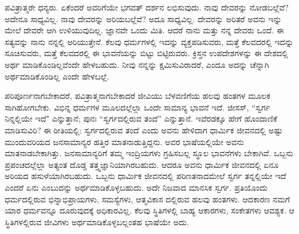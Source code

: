 ಪವಿತ್ರಾತ್ಮರೇ ಧನ್ಯರು. ಏಕೆಂದರೆ ಅವರಿಗೆಯೇ ಭಗವತ್ ದರ್ಶನ ಲಭಿಸುವುದು. ನಾವು ದೇವರನ್ನು ನೋಡಬಲ್ಲೆವೆ? ಅದೇನೂ ಸಾಧ್ಯವಿಲ್ಲ. ನಾವು ದೇವರನ್ನು ಅರಿಯಬಲ್ಲೆವೆ? ಅದೂ ಸಾಧ್ಯವಿಲ್ಲ. ದೇವರನ್ನು ಅರಿತರೆ ಅವನು ಇನ್ನು ಮೇಲೆ ದೇವರೇ ಆಗಿ ಉಳಿಯುವುದಿಲ್ಲ. ಜ್ಞಾನವೇ ಒಂದು ಮಿತಿ. ಆದರೆ ನಾನು ಮತ್ತು ನನ್ನ ದೇವರು ಒಂದೆ. ಈ ಸತ್ಯವನ್ನು ನಾನು ನನ್ನಲ್ಲಿ ಅರಿಯುತ್ತೇನೆ. ಕೆಲವು ಧರ್ಮಗಳಲ್ಲಿ ಇದನ್ನು ವ್ಯಕ್ತಪಡಿಸುವರು, ಮತ್ತೆ ಕೆಲವದರಲ್ಲಿ ಇದನ್ನು ಸೂಚಿಸುವರು, ಮತ್ತೆ ಕೆಲವದರಲ್ಲಿ ಈ ಭಾವನೆಯನ್ನು ಬಿಟ್ಟು ಬಿಟ್ಟಿರುವರು. ಕ್ರಿಸ್ತನ ಉಪದೇಶಗಳನ್ನು ಈ ದೇಶದಲ್ಲಿ ಅರ್ಥ ಮಾಡಿಕೊಂಡಿಲ್ಲವೆಂದೇ ಹೇಳಬಹುದು. ನೀವು ನನ್ನನ್ನು ಕ್ಷಮಿಸುವಿರಾದರೆ, ಎಂದೂ ಅದನ್ನು ಚೆನ್ನಾಗಿ ಅರ್ಥಮಾಡಿಕೊಂಡಿಲ್ಲ ಎಂದೇ ಹೇಳಬಲ್ಲೆ.

ಪರಿಪೂರ್ಣನಾಗಬೇಕಾದರೆ, ಪವಿತ್ರಾತ್ಮನಾಗಬೇಕಾದರೆ ಜೀವಿಯು ಬೆಳವಣಿಗೆಯ ಹಲವು ಹಂತಗಳ ಮೂಲಕ ಸಾಗಿಹೋಗಬೇಕು. ವಿಭಿನ್ನ ಧರ್ಮಗಳ ಮೂಲದಲ್ಲೆಲ್ಲಾ ಒಂದೇ ಸಾಮಾನ್ಯ ಭಾವನೆ ಇದೆ. ಜೀಸಸ್, “ಸ್ವರ್ಗ ನಿನ್ನಲ್ಲಿಯೇ ಇದೆ" ಎನ್ನುತ್ತಾನೆ; ಪುನಃ “ಸ್ವರ್ಗದಲ್ಲಿರುವ ತಂದೆ'' ಎನ್ನುತ್ತಾನೆ. ಇವೆರಡಕ್ಕೂ ಹೇಗೆ ಹೊಂದಾಣಿಕೆ ಮಾಡಿಸುವಿರಿ? ಈ ರೀತಿಯಲ್ಲಿ: ಸ್ವರ್ಗದಲ್ಲಿರುವ ತಂದೆ ಎಂದು ಅವನು ಹೇಳಿದಾಗ ಧಾರ್ಮಿಕ ಜೀವನದಲ್ಲಿ ಅಷ್ಟು ಮುಂದುವರಿಯದ ಜನಸಾಮಾನ್ಯರ ಹತ್ತಿರ ಮಾತನಾಡುತ್ತಿದ್ದನು. ಅವರ ಭಾಷೆಯಲ್ಲಿಯೇ ಅವನು ಮಾತನಾಡಬೇಕಾಗಿತ್ತು. ಜನಸಾಮಾನ್ಯರಿಗೆ ತಮ್ಮ ಇಂದ್ರಿಯಗಳು ಗ್ರಹಿಸಬಲ್ಲ ಸ್ಥೂಲ ಭಾವನೆಗಳು ಬೇಕಾಗಿವೆ. ಒಬ್ಬನು ಪ್ರಪಂಚದಲ್ಲೆಲ್ಲಾ ಅತ್ಯಂತ ದೊಡ್ಡ ತತ್ತ್ವಜ್ಞಾನಿಯಾಗಿರಬಹುದು. ಆದರೂ ಅವನು ಧಾರ್ಮಿಕ ಜೀವನದಲ್ಲಿ ಏನೂ ಅರಿಯದ ಹಸುಳೆಯಾಗಿರಬಹುದು. ಒಬ್ಬನು ಧಾರ್ಮಿಕ ಜೀವನದಲ್ಲಿ ಪರಿಣತನಾದಮೇಲೆ ಸ್ವರ್ಗ ತನ್ನಲ್ಲಿಯೇ ಇದೆ ಎಂದರೆ ಏನು ಎಂಬುದನ್ನು ಅರ್ಥಮಾಡಿಕೊಳ್ಳಬಹುದು. ಅದೇ ನಿಜವಾದ ಮಾನಸಿಕ ಸ್ವರ್ಗ. ಪ್ರತಿಯೊಂದು ಧರ್ಮದಲ್ಲಿರುವ ಭಿನ್ನಾಭಿಪ್ರಾಯಗಳು, ಸಮಸ್ಯೆಗಳು, ಆತ್ಮವಿಕಾಸ ದಲ್ಲಿರುವ ಹಲವು ಹಂತಗಳು. ಆದಕಾರಣ ನಮಗೆ ಯಾರ ಧರ್ಮವನ್ನೂ ದೂರುವುದಕ್ಕೆ ಅಧಿಕಾರವಿಲ್ಲ. ಕೆಲವು ಸ್ಥಿತಿಗಳಲ್ಲಿ ಬಾಹ್ಯ ಆಕಾರಗಳು, ಸಂಕೇತಗಳು ಆವಶ್ಯಕ. ಆ ಸ್ಥಿತಿಗಳಲ್ಲಿರುವ ಜೀವಿಗಳು ಅರ್ಥಮಾಡಿಕೊಳ್ಳಬಲ್ಲಂತಹ ಭಾಷೆಯೇ ಅದು.

